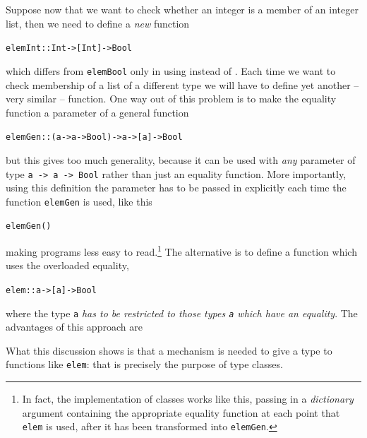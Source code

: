 Suppose now that we want to check whether
an integer is a member of an integer list, then we need to define a
\textit{new}
function 
\begin{alltt}
elemInt :: Int -> [Int] -> Bool
\end{alltt}
which differs from \texttt{elemBool} only in using \texttt{}
instead of \texttt{}. Each time we want to check
membership of a list of a different type we will have to define yet
another -- very similar -- function. 
One way out of this problem is to make the equality function a parameter
of a general function 
\begin{alltt}
elemGen :: (a -> a -> Bool) -> a -> [a] -> Bool
\end{alltt} but this gives too much
generality, because it can be used with {\em any\/} parameter of type
\texttt{a -> a -> Bool} rather than just an equality function. More importantly, using this definition the parameter has to be passed in explicitly each time the
function \texttt{elemGen} is used, like this
\begin{alltt}
elemGen ()
\end{alltt}
making programs less easy to read.\footnote{In fact, the implementation of classes works like this, passing in a \emph{dictionary} argument containing the appropriate equality function at each point that \texttt{elem} is used, after it has been transformed into  \texttt{elemGen}.}
The alternative is to define a function which uses the overloaded
equality,
\begin{alltt}
elem :: a -> [a] -> Bool
\end{alltt}
where the type \texttt{a} \emph{has to be restricted to those types \texttt{a} which have
an equality}. The advantages of this approach are
What this discussion shows is that a mechanism is needed to give a type
to functions like \texttt{elem}: that is precisely the purpose of type
classes.

